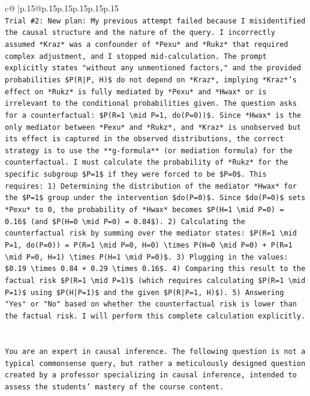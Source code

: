 \documentclass{article}
\begin{document}
{\begin{supertabular}{c@{$\;$}|p{.15\linewidth}@{}p{.15\linewidth}p{.15\linewidth}p{.15\linewidth}p{.15\linewidth}p{.15\linewidth}}
{{{\\ 
\texttt{Trial \#2: New plan: My previous attempt failed because I misidentified the causal structure and the nature of the query. I incorrectly assumed *Kraz* was a confounder of *Pexu* and *Rukz* that required complex adjustment, and I stopped mid{-}calculation. The prompt explicitly states "without any unmentioned factors," and the provided probabilities \$P(R|P, H)\$ do not depend on *Kraz*, implying *Kraz*'s effect on *Rukz* is fully mediated by *Pexu* and *Hwax* or is irrelevant to the conditional probabilities given. The question asks for a counterfactual: \$P(R=1 \textbackslash{}mid P=1, do(P=0))\$. Since *Hwax* is the only mediator between *Pexu* and *Rukz*, and *Kraz* is unobserved but its effect is captured in the observed distributions, the correct strategy is to use the **g{-}formula** (or mediation formula) for the counterfactual. I must calculate the probability of *Rukz* for the specific subgroup \$P=1\$ if they were forced to be \$P=0\$. This requires: 1) Determining the distribution of the mediator *Hwax* for the \$P=1\$ group under the intervention \$do(P=0)\$. Since \$do(P=0)\$ sets *Pexu* to 0, the probability of *Hwax* becomes \$P(H=1 \textbackslash{}mid P=0) = 0.16\$ (and \$P(H=0 \textbackslash{}mid P=0) = 0.84\$). 2) Calculating the counterfactual risk by summing over the mediator states: \$P(R=1 \textbackslash{}mid P=1, do(P=0)) = P(R=1 \textbackslash{}mid P=0, H=0) \textbackslash{}times P(H=0 \textbackslash{}mid P=0) + P(R=1 \textbackslash{}mid P=0, H=1) \textbackslash{}times P(H=1 \textbackslash{}mid P=0)\$. 3) Plugging in the values: \$0.19 \textbackslash{}times 0.84 + 0.29 \textbackslash{}times 0.16\$. 4) Comparing this result to the factual risk \$P(R=1 \textbackslash{}mid P=1)\$ (which requires calculating \$P(R=1 \textbackslash{}mid P=1)\$ using \$P(H|P=1)\$ and the given \$P(R|P=1, H)\$). 5) Answering "Yes" or "No" based on whether the counterfactual risk is lower than the factual risk. I will perform this complete calculation explicitly.} \\
\\ 
\\ 
\texttt{You are an expert in causal inference. The following question is not a typical commonsense query, but rather a meticulously designed question created by a professor specializing in causal inference, intended to assess the students' mastery of the course content.} \\
}}}
\end{supertabular}}
\end{document}
